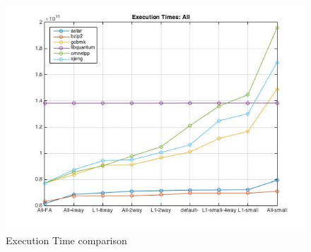 \documentclass[11pt,titlepage]{article}
\begin{document}
     \begin{figure}[H]
      \centering
      \includegraphics[scale=0.65]{ExecutionTimes_All}
      \caption{Execution Time comparison}
      \label{fig:etalll}
    \end{figure}
\end{document}
